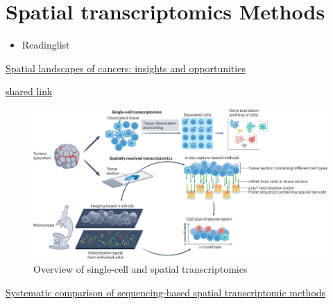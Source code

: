 \documentclass[
]{book}
\providecommand{\tightlist}{%
  \setlength{\itemsep}{0pt}\setlength{\parskip}{0pt}}
\begin{document}
\hypertarget{spatial-transcriptomics-methods}{%
\section{Spatial transcriptomics Methods}\label{spatial-transcriptomics-methods}}

\begin{itemize}
\tightlist
\item
  Readinglist
\end{itemize}

\href{https://www.nature.com/articles/s41571-024-00926-7}{Spatial landscapes of cancers: insights and opportunities}

\href{https://www.nature.com/articles/s41571-024-00926-7.epdf?sharing_token=GNc_eiAuNQQXXGFjfD7Kz9RgN0jAjWel9jnR3ZoTv0MHjcqFYhINxQ2qcmoTpEHzNQAj3O3rn9odrZBd_LDLTzvupF49PpdT1TuLQEFlMTPjoCpw5MPA4eKqU39OI50crmunb320YA8fJd1osn9issYG6VPFpJJgFhZwbd54b7g\%3D}{shared link}

\begin{figure}
\centering
\includegraphics{./figs/spatialtech/Overview of single-cell and spatial transcriptomics.webp}
\caption{Overview of single-cell and spatial transcriptomics}
\end{figure}

\href{https://www.nature.com/articles/s41592-024-02325-3}{Systematic comparison of sequencing-based spatial transcriptomic methods}
\end{document}
